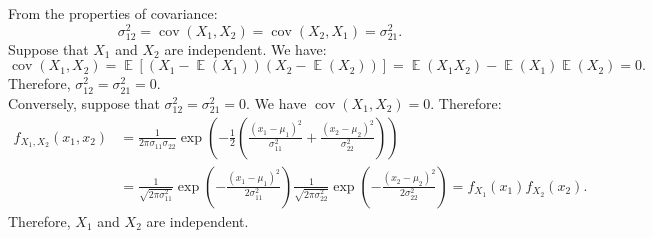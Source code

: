 \documentclass{huhtakm-template-book-v2}
\DeclareMathOperator{\E}{\mathbb{E}}
\DeclareMathOperator{\cov}{cov}
\begin{document}
    \begin{proofing}
        From the properties of covariance:
        \begin{equation*}
            \sigma_{12}^{2} = \cov(X_{1}, X_{2}) = \cov(X_{2}, X_{1}) = \sigma_{21}^{2}.
        \end{equation*}
        Suppose that $X_{1}$ and $X_{2}$ are independent. We have:
        \begin{equation*}
            \cov(X_{1}, X_{2}) = \E[(X_{1} - \E(X_{1}))(X_{2} - \E(X_{2}))] = \E(X_{1}X_{2}) - \E(X_{1})\E(X_{2}) = 0.
        \end{equation*}
        Therefore, $\sigma_{12}^{2} = \sigma_{21}^{2} = 0$.\\
        Conversely, suppose that $\sigma_{12}^{2} = \sigma_{21}^{2} = 0$. We have $\cov(X_{1}, X_{2}) = 0$. Therefore:
        \begin{align*}
            f_{X_{1}, X_{2}}(x_{1}, x_{2}) &= \frac{1}{2\pi\sigma_{11}\sigma_{22}} \exp\left(-\frac{1}{2}\left(\frac{(x_{1} - \mu_{1})^{2}}{\sigma_{11}^{2}} + \frac{(x_{2} - \mu_{2})^{2}}{\sigma_{22}^{2}}\right)\right)\\
            &= \frac{1}{\sqrt{2\pi\sigma_{11}^{2}}} \exp\left(-\frac{(x_{1} - \mu_{1})^{2}}{2\sigma_{11}^{2}}\right) \frac{1}{\sqrt{2\pi\sigma_{22}^{2}}} \exp\left(-\frac{(x_{2} - \mu_{2})^{2}}{2\sigma_{22}^{2}}\right) = f_{X_{1}}(x_{1})f_{X_{2}}(x_{2}).
        \end{align*}
        Therefore, $X_{1}$ and $X_{2}$ are independent.
    \end{proofing}
	\newpage
\end{document}
